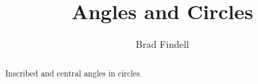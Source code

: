 \documentclass[numbers,nooutcomes,twoside,hints]{xourse}
\title{Angles and Circles}
\author{Brad Findell}
\begin{document}
\begin{abstract}
Inscribed and central angles in circles.  
\end{abstract}
\maketitle





\end{document}
